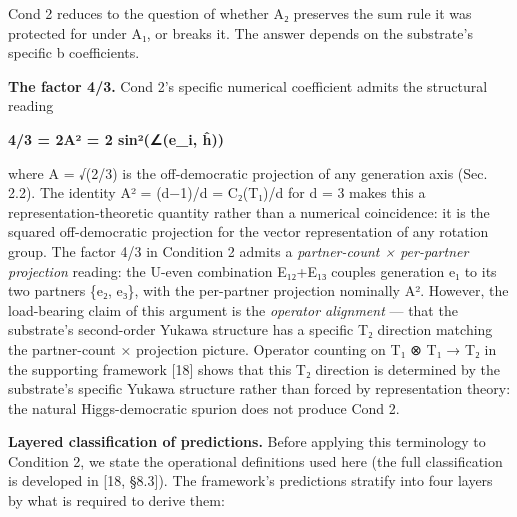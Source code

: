 \documentclass[
  11pt,
  letterpaper,
]{article}
\begin{document}
Cond 2 reduces to the question of whether A₂ preserves the sum rule it
was protected for under A₁, or breaks it. The answer depends on the
substrate's specific b coefficients.

\textbf{The factor 4/3.} Cond 2's specific numerical coefficient admits
the structural reading

\textbf{4/3 = 2A² = 2 sin²(∠(e\_i, ĥ))}

where A = √(2/3) is the off-democratic projection of any generation axis
(Sec. 2.2). The identity A² = (d−1)/d = C₂(T₁)/d for d = 3 makes this a
representation-theoretic quantity rather than a numerical coincidence:
it is the squared off-democratic projection for the vector
representation of any rotation group. The factor 4/3 in Condition 2
admits a \emph{partner-count × per-partner projection} reading: the
U-even combination E₁₂+E₁₃ couples generation e₁ to its two partners
\{e₂, e₃\}, with the per-partner projection nominally A². However, the
load-bearing claim of this argument is the \emph{operator alignment} ---
that the substrate's second-order Yukawa structure has a specific T₂
direction matching the partner-count × projection picture. Operator
counting on T₁ ⊗ T₁ → T₂ in the supporting framework {[}18{]} shows that
this T₂ direction is determined by the substrate's specific Yukawa
structure rather than forced by representation theory: the natural
Higgs-democratic spurion does not produce Cond 2.

\textbf{Layered classification of predictions.} Before applying this
terminology to Condition 2, we state the operational definitions used
here (the full classification is developed in {[}18, §8.3{]}). The
framework's predictions stratify into four layers by what is required to
derive them:
\end{document}

